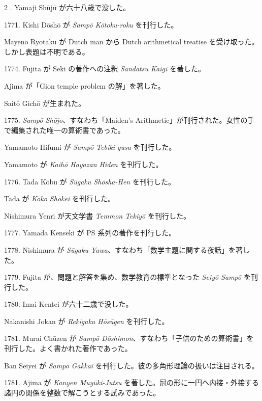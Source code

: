 \documentclass[11pt]{article}
\newcommand{\scanfooter}{}
\begin{document}
\begin{multicols}{2}
. Yamaji Shūjū が六十八歳で没した。

1771. Kishi Dōshō が \emph{Sampō Kōtoku-roku} を刊行した。

Mayeno Ryōtaku が Dutch man から Dutch arithmetical treatise を受け取った。しかし表題は不明である。

1774. Fujita が Seki の著作への注釈 \emph{Sandatsu Kaigi} を著した。

Ajima が「Gion temple problem の解」を著した。

Saitō Gichō が生まれた。

1775. \emph{Sampō Shōjo}、すなわち「Maiden's Arithmetic」が刊行された。女性の手で編集された唯一の算術書であった。

Yamamoto Hifumi が \emph{Sampō Tebiki-gusa} を刊行した。

Yamamoto が \emph{Kaihō Hayazan Hiden} を刊行した。

1776. Tada Kōbu が \emph{Sūgaku Shōsha-Hen} を刊行した。

Tada が \emph{Kōko Shōkei} を刊行した。

Nishimura Yenri が天文学書 \emph{Temmon Tekiyō} を刊行した。

1777. Yamada Kenseki が PS 系列の著作を刊行した。

1778. Nishimura が \emph{Sūgaku Yawa}、すなわち「数学主題に関する夜話」を著した。

1779. Fujita が、問題と解答を集め、数学教育の標準となった \emph{Seiyō Sampō} を刊行した。

1780. Imai Kentei が六十二歳で没した。

Nakanishi Jokan が \emph{Rekigaku Hōsūgen} を刊行した。

1781. Murai Chūzen が \emph{Sampō Dōshimon}、すなわち「子供のための算術書」を刊行した。よく書かれた著作であった。

Ban Seiyei が \emph{Sampō Gakkai} を刊行した。彼の多角形理論の扱いは注目される。

1781. Ajima が \emph{Kanyen Muyūki-Jutsu} を著した。冠の形に一円へ内接・外接する諸円の関係を整数で解こうとする試みであった。
\end{multicols}
\scanfooter
\end{document}
